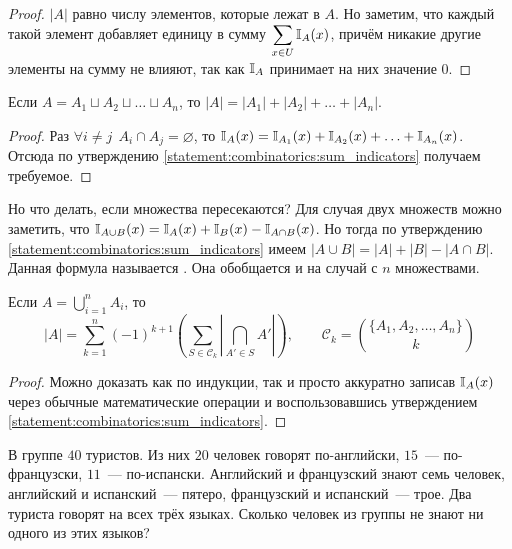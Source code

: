 \begin{proof}
    $ |A| $ равно числу элементов, которые лежат в $ A $.
    Но заметим, что каждый такой элемент добавляет единицу в сумму $ \displaystyle \sum_{x \in U} \mathbb{I}_A(x) $,
    причём никакие другие элементы на сумму не влияют, так как $ \mathbb{I}_A $ принимает на них значение $ 0 $.
\end{proof}

\begin{corollary}
    Если $ A = A_1 \sqcup A_2 \sqcup \ldots \sqcup A_n $, то $ |A| = |A_1| + |A_2| + \ldots + |A_n| $.
\end{corollary}

\begin{proof}
    Раз $ \forall i \neq j \;\, A_i \cap A_j = \varnothing $, то $ \mathbb{I}_A(x) = \mathbb{I}_{A_1}(x) + \mathbb{I}_{A_2}(x) + \ldots + \mathbb{I}_{A_n}(x) $.
    Отсюда по утверждению \ref{statement:combinatorics:sum_indicators} получаем требуемое.
\end{proof}

Но что делать, если множества пересекаются?
Для случая двух множеств можно заметить, что $ \mathbb{I}_{A \cup B}(x) = \mathbb{I}_A(x) + \mathbb{I}_B(x) - \mathbb{I}_{A \cap B}(x) $.
Но тогда по утверждению \ref{statement:combinatorics:sum_indicators} имеем $ |A \cup B| = |A| + |B| - |A \cap B| $.
Данная формула называется .
Она обобщается и на случай с $ n $ множествами.

\begin{lemma}
    Если $ \displaystyle A = \bigcup_{i=1}^n A_i $, то
    \[
        |A| = \sum_{k=1}^n (-1)^{k+1} \left( \sum_{S \in \mathcal{C}_k} \left| \bigcap_{A' \in S} A' \right| \right), \qquad
        \mathcal{C}_k = \binom{\{ A_1, A_2, \ldots, A_n \}}{k}
    \]
\end{lemma}

\begin{proof}
    Можно доказать как по индукции, так и просто аккуратно записав $ \mathbb{I}_A(x) $ через обычные математические операции
    и воспользовавшись утверждением \ref{statement:combinatorics:sum_indicators}.
\end{proof}

\begin{Exercise}[counter=SecExercise]
    \noindent
    В группе $ 40 $ туристов.
    Из них $ 20 $ человек говорят по-английски, $ 15 $~--- по-французски, $ 11 $~--- по-испански.
    Английский и французский знают семь человек, английский и испанский~--- пятеро, французский и испанский~--- трое.
    Два туриста говорят на всех трёх языках.
    Сколько человек из группы не знают ни одного из этих языков?
\end{Exercise}

